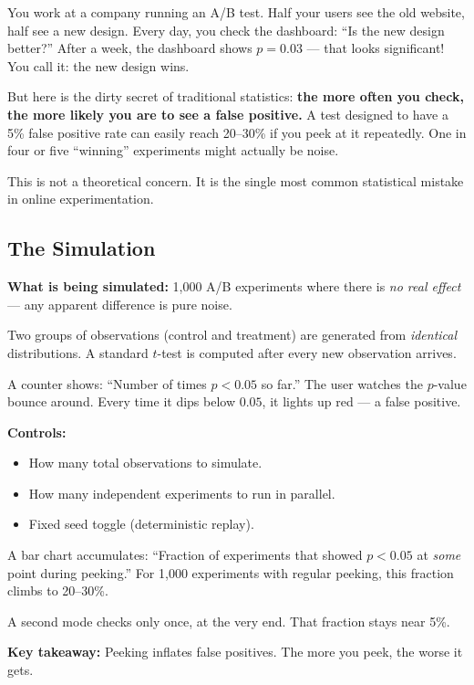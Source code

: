 \documentclass[12pt, a4paper]{article}
\begin{document}
\begin{intuition}
You work at a company running an A/B test.  Half your users see the old
website, half see a new design.  Every day, you check the dashboard:
``Is the new design better?''  After a week, the dashboard shows $p=0.03$ ---
that looks significant!  You call it: the new design wins.

But here is the dirty secret of traditional statistics: \textbf{the more often
you check, the more likely you are to see a false positive.}  A test designed
to have a 5\% false positive rate can easily reach 20--30\% if you peek at it
repeatedly.  One in four or five ``winning'' experiments might actually be
noise.

This is not a theoretical concern.  It is the single most common statistical
mistake in online experimentation.
\end{intuition}

\subsection{The Simulation}

\begin{simulation}
\textbf{What is being simulated:}
1,000 A/B experiments where there is \emph{no real effect} --- any apparent
difference is pure noise.

Two groups of observations (control and treatment) are generated from
\emph{identical} distributions.  A standard $t$-test is computed after every
new observation arrives.

A counter shows: ``Number of times $p<0.05$ so far.''  The user watches the
$p$-value bounce around.  Every time it dips below $0.05$, it lights up red
--- a false positive.

\textbf{Controls:}
\begin{itemize}[nosep]
  \item How many total observations to simulate.
  \item How many independent experiments to run in parallel.
  \item Fixed seed toggle (deterministic replay).
\end{itemize}

A bar chart accumulates: ``Fraction of experiments that showed $p<0.05$ at
\emph{some} point during peeking.''  For 1,000 experiments with regular
peeking, this fraction climbs to 20--30\%.

A second mode checks only once, at the very end.  That fraction stays near
5\%.

\textbf{Key takeaway:}
Peeking inflates false positives.  The more you peek, the worse it gets.
\end{simulation}
\end{document}
